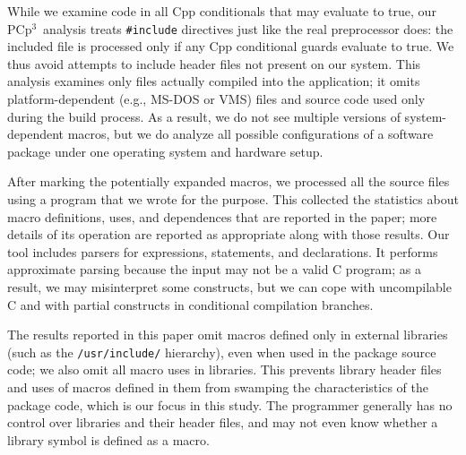 \documentclass[10pt]{article}
\newcommand{\pcp}{\mbox{\textsf{PCp}$^3$}}
\newcommand{\file}[1]{\texttt{#1}}
\begin{document}
While we examine code in all Cpp conditionals that may evaluate to true,
our \pcp\ analysis treats {\tt \#include} directives just like the real
preprocessor does:  the included file is processed only if any Cpp
conditional guards evaluate to true.  We thus avoid attempts to include
header files not present on our system.  This analysis examines only files
actually compiled into the application; it omits platform-dependent
(e.g., MS-DOS or VMS) files and source code used only during the build
process.  As a result, we do not see multiple versions of system-dependent
macros, but we do analyze all possible configurations of a software package
under one operating system and hardware setup.







After marking the potentially expanded macros, we processed all the source
files using a program that we wrote for the purpose.  This collected the
statistics about macro definitions, uses, and dependences that are
reported in the paper; more details of its operation are reported as
appropriate along with those results.  Our tool includes parsers for
expressions, statements, and declarations.  It performs approximate parsing
because the input may not be a valid C program; as a result, we may
misinterpret some constructs, but we can cope with uncompilable C and with
partial constructs in conditional compilation branches.

The results reported in this paper omit macros defined only in external
libraries (such as the \file{/usr/include/} hierarchy), even when used in
the package source code; we also omit all macro uses in libraries.  This
prevents library header files and uses of macros defined in them from
swamping the characteristics of the
package code, which is our focus in this study.  The programmer generally
has no control over libraries and their header files, and may not even know
whether a library symbol is defined as a macro.
\end{document}
